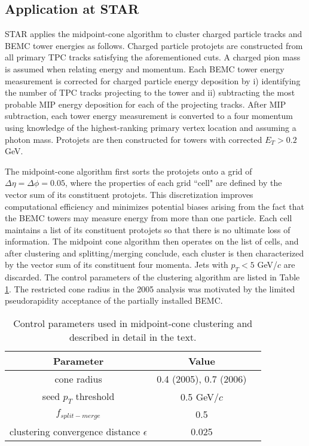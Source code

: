 \subsection{Application at STAR}

STAR applies the midpoint-cone algorithm to cluster charged particle tracks
and BEMC tower energies as follows. Charged particle protojets are constructed
from all primary TPC tracks satisfying the aforementioned cuts. A charged pion
mass is assumed when relating energy and momentum. Each BEMC tower energy
measurement is corrected for charged particle energy deposition by i)
identifying the number of TPC tracks projecting to the tower and ii)
subtracting the most probable MIP energy deposition for each of the projecting
tracks. After MIP subtraction, each tower energy measurement is converted to a
four momentum using knowledge of the highest-ranking primary vertex location
and assuming a photon mass. Protojets are then constructed for towers with
corrected $E_{T}>0.2 $GeV.

The midpoint-cone algorithm first sorts the protojets onto a grid of
$\Delta\eta=\Delta\phi=0.05$, where the properties of each grid ``cell" are
defined by the vector sum of its constituent protojets. This discretization
improves computational efficiency and minimizes potential biases arising from
the fact that the BEMC towers may measure energy from more than one particle.
Each cell maintains a list of its constituent protojets so that there is no
ultimate loss of information. The midpoint cone algorithm then operates on the
list of cells, and after clustering and splitting/merging conclude, each
cluster is then characterized by the vector sum of its constituent four
momenta. Jets with $p_{T}<5$ GeV/$c$ are discarded. The control parameters of
the clustering algorithm are listed in Table \ref{tbl:jetfinding-parameters}.
The restricted cone radius in the 2005 analysis was motivated by the limited
pseudorapidity acceptance of the partially installed BEMC.

\begin{table}
  \begin{center}
      \begin{tabular}{|c|c|c|}
        \hline
        Parameter & Value \\
        \hline
        cone radius  &   0.4 (2005), 0.7 (2006) \\
        seed $p_{T}$ threshold  &   0.5 GeV/$c$ \\
        $f_{split-merge}$  &  0.5  \\
        clustering convergence distance $\epsilon$  &  0.025  \\
        \hline
      \end{tabular}
  \end{center}
  \caption{Control parameters used in midpoint-cone clustering and described in detail in the text.}
  \label{tbl:jetfinding-parameters}
\end{table}
